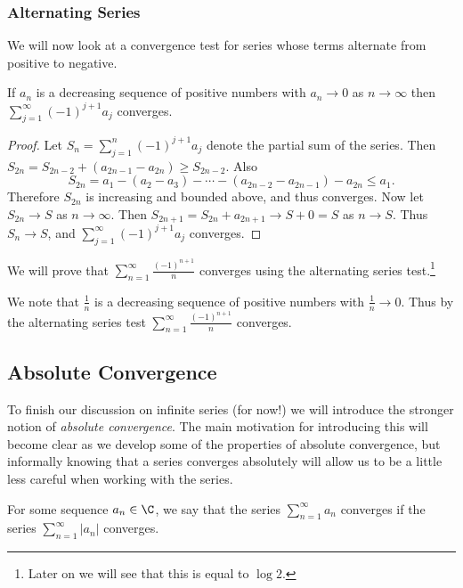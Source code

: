 \subsubsection{Alternating Series}

We will now look at a convergence test for series whose terms alternate from positive to negative.

\begin{theorem}
	If $a_n$ is a decreasing sequence of positive numbers with $a_n \rightarrow 0$ as $n \rightarrow \infty$ then $\sum_{j = 1}^{\infty} (-1)^{j + 1}a_j$ converges.
\end{theorem}
\begin{proof}
	Let $S_n = \sum_{j = 1}^n (-1)^{j + 1}a_j$ denote the partial sum of the series. Then
	$
		S_{2n} = S_{2n - 2} + (a_{2n - 1} - a_{2n}) \geq S_{2n - 2}.
	$
	Also
	$$
		S_{2n} = a_1 - (a_2 - a_3) - \cdots - (a_{2n - 2} - a_{2n - 1}) - a_{2n}
		\leq a_1.
	$$
	Therefore $S_{2n}$ is increasing and bounded above, and thus converges. Now let $S_{2n} \rightarrow S$ as $n \rightarrow \infty$. Then $S_{2n + 1} = S_{2n} + a_{2n + 1} \rightarrow S + 0 = S$ as $n \rightarrow S$. Thus $S_n \rightarrow S$, and $\sum_{j = 1}^{\infty} (-1)^{j + 1}a_j$ converges.
\end{proof}

\begin{example}
	We will prove that $\sum_{n = 1}^{\infty} \frac{(-1)^{n + 1}}{n}$ converges using the alternating series test.\footnote{Later on we will see that this is equal to $\log 2$.}

	We note that $\frac{1}{n}$ is a decreasing sequence of positive numbers with $\frac{1}{n} \rightarrow 0$. Thus by the alternating series test $\sum_{n = 1}^{\infty} \frac{(-1)^{n + 1}}{n}$ converges. 
\end{example}

\subsection{Absolute Convergence}

To finish our discussion on infinite series (for now!) we will introduce the stronger notion of \emph{absolute convergence}. The main motivation for introducing this will become clear as we develop some of the properties of absolute convergence, but informally knowing that a series converges absolutely will allow us to be a little less careful when working with the series.

\begin{definition}
	For some sequence $a_n \in \C$, we say that the series $\sum_{n = 1}^{\infty} a_n$ converges  if the series $\sum_{n = 1}^{\infty} |a_n|$ converges. 
\end{definition}

